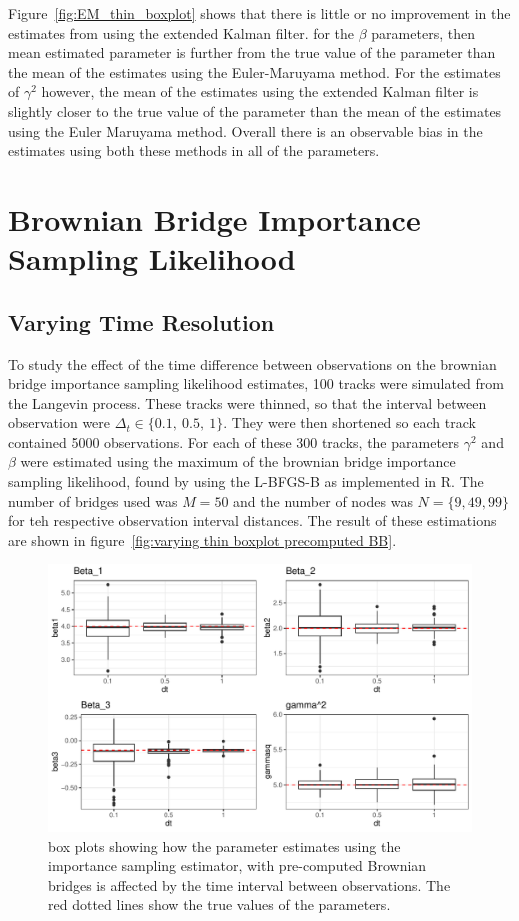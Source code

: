 Figure~\ref{fig:EM_thin_boxplot} shows that there is little or no improvement in the estimates from using the extended Kalman filter. for the $\beta$ parameters, then mean estimated parameter is further from the true value of the parameter than the mean of the estimates using the Euler-Maruyama method. For the estimates of $\gamma^2$ however, the mean of the estimates using the extended Kalman filter is slightly closer to the true value of the parameter than the mean of the estimates using the Euler Maruyama method. Overall there is an observable bias in the estimates using both these methods in all of the parameters.

\section{Brownian Bridge Importance Sampling Likelihood}

\subsection{Varying Time Resolution}
To study the effect of the time difference between observations on the brownian bridge importance sampling likelihood estimates, 100 tracks were simulated from the Langevin process. These tracks were thinned, so that the interval between observation were $\Delta_t \in \{0.1, \ 0.5, \ 1\}$. They were then shortened so each track contained 5000 observations. For each of these 300 tracks, the parameters $\gamma^2$ and $\beta$ were estimated using the maximum of the brownian bridge importance sampling likelihood, found by using the L-BFGS-B as implemented in R. The number of bridges used was $M=50$ and the number of nodes was $N =\{9,49,99\}$ for teh respective observation interval distances. The result of these estimations are shown in figure~\ref{fig:varying thin boxplot precomputed BB}.

\begin{figure}[H]
    \centering
    \includegraphics[width=\linewidth]{Images/Results/varying dt plot brownian bridge likelihood.pdf}
    \caption[Box plots of Parameter Estimates for various observation intervals]{box plots showing how the parameter estimates using the importance sampling estimator, with pre-computed Brownian bridges is affected by the time interval between observations. The red dotted lines show the true values of the parameters.}
    \label{fig:varying dt boxplot BB}
\end{figure}

